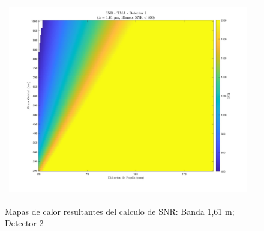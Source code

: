 \begin{landscape}
\begin{figure}[p]
\begin{tabular}{cc}
\includegraphics[width=0.48\linewidth]{4.Payload/SNR/SNR_Lambda1_Detector2_Telescopio4_heatmap.jpg} \\
\end{tabular}
\caption{Mapas de calor resultantes del calculo de SNR: Banda 1,61 \textmu m; Detector 2}
\end{figure}
\end{landscape}



